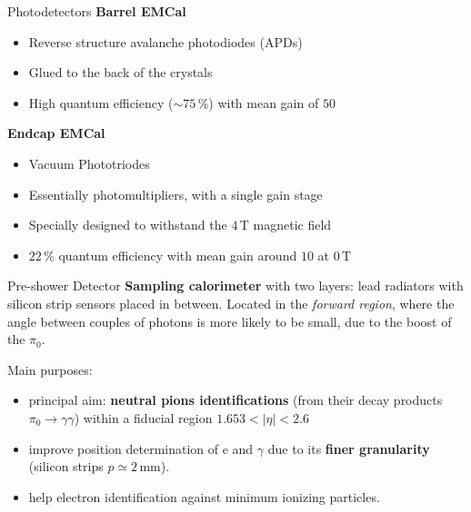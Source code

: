 \documentclass[10pt]{beamer}
\begin{document}
\begin{frame}{Photodetectors}
    \textbf{Barrel EMCal}
    \begin{itemize}
        \item Reverse structure avalanche photodiodes (APDs)
        \item Glued to the back of the crystals
        \item High quantum efficiency ($\sim 75$\,\%) with mean gain of $50$
    \end{itemize}{}
    
    \textbf{Endcap EMCal}
    \begin{itemize}
        \item Vacuum Phototriodes
        \item Essentially photomultipliers, with a single gain stage
        \item Specially designed to withstand the $4$\,T magnetic field
        \item $22$\,\% quantum efficiency with mean gain around $10$ at $0$\,T
    \end{itemize}
\end{frame}

\begin{frame}{Pre-shower Detector}
    \textbf{Sampling calorimeter} with two layers: lead radiators with silicon strip sensors placed in between.
    Located in the \emph{forward region}, where the angle between couples of photons is more likely to be small, due to the boost of the $\pi_0$.
    
    Main purposes:
    \begin{itemize}
        \item principal aim: \textbf{neutral pions identifications} (from their decay products $\pi_0 \rightarrow \gamma \gamma$) within a fiducial region $1.653 < |\eta| < 2.6$  
        \item improve position determination of e and $\gamma$ due to its \textbf{finer granularity} (silicon strips $p\simeq2\,$mm).
        \item help electron identification against minimum ionizing particles.
    \end{itemize}{}
    
\end{frame}
\end{document}
